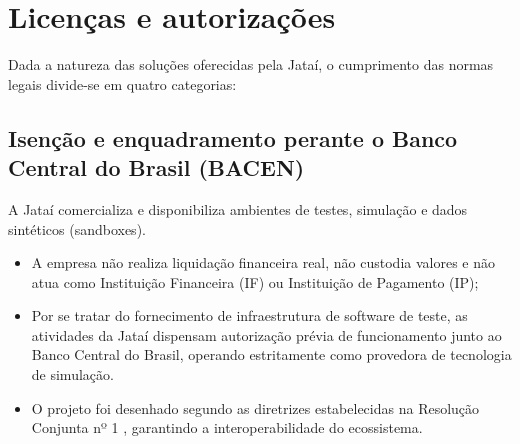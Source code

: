 \documentclass[
  12pt,
  openright,
  oneside,
  a4paper,
  brazilian
]{abntex2}
\begin{document}
\begin{table}[htbp]
\centering
\caption{Documentação exigida para abertura e regularização da Jataí.}
\label{tab:documentos_abertura}
\end{table}

\section{Licenças e autorizações}
\label{sec:licencas_conformidade}

Dada a natureza das soluções oferecidas pela Jataí, o cumprimento das normas legais divide-se em quatro categorias:

\subsection{Isenção e enquadramento perante o Banco Central do Brasil (BACEN)}
A Jataí comercializa e disponibiliza ambientes de testes, simulação e dados sintéticos (sandboxes). 
\begin{itemize}
    \item A empresa não realiza liquidação financeira real, não custodia valores e não atua como Instituição Financeira (IF) ou Instituição de Pagamento (IP);
    \item Por se tratar do fornecimento de infraestrutura de software de teste, as atividades da Jataí dispensam autorização prévia de funcionamento junto ao Banco Central do Brasil, operando estritamente como provedora de tecnologia de simulação.
    \item O projeto foi desenhado segundo as diretrizes estabelecidas na Resolução Conjunta nº 1 \cite{bcb2020resolucao1}, garantindo a interoperabilidade do ecossistema.
\end{itemize}
\end{document}
